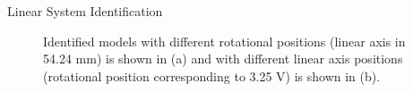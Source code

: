 \documentclass[10pt]{beamer}
\begin{document}
\begin{frame}{Linear System Identification}
  \begin{figure}[h]
    \centering %
    \qquad
    \caption{\label{fig:different_lin_angle} Identified models with different rotational positions (linear axis in 54.24 mm) is shown in (a) and with different linear axis positions (rotational position corresponding to 3.25 V) is shown in (b).}
  \end{figure}
\end{frame}
\end{document}
